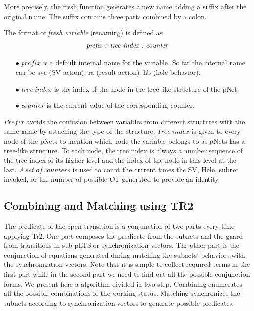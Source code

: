 \documentclass{lncs/llncs}
\newcommand{\TODO}[1]{\textcolor{red}{\textbf{[TODO:#1]}}}
\begin{document}
More precisely, the fresh function generates a new name adding a
suffix after the original name. The suffix contains three parts
combined by a colon.  


\begin{definition}\label{fresh-variable}
The format of \emph{fresh variable} (renaming) is defined as:
$$\emph{prefix : tree\ index\ :\ counter}$$
\begin{itemize}
   \item[$\bullet$] $prefix$ is a default internal name for the variable. So far the internal name can be  sva (SV action), ra (result action), hb (hole behavior).
   \item[$\bullet$] $tree\ index$ is the index of the node in the tree-like structure of the pNet.
   \item[$\bullet$] $counter$ is the current value of the corresponding counter.
\end{itemize}
\end{definition}


$Prefix$ avoids the confusion between variables from different structures with the same name by attaching the type of the structure. $Tree\ index$ is given to every node of the pNets to mention which node the variable belongs to as pNets has a tree-like structure. To each node, the tree index is always a number sequence of the tree index of its higher level and the index of the node in this level at the last. $A\ set\ of\ counters$ is used to count the current times the SV, Hole, subnet invoked, or the number of possible OT generated to provide an identity. 


\subsection{Combining and Matching using TR2}

The predicate of the open transition is a conjunction of two parts
every time applying Tr2. One part composes the predicate from the
subnets and the guard from transitions in sub-pLTS or synchronization
vectors. The other part is the conjunction of equations generated
during matching the subnets' behaviors with the synchronization
vectors. Note that it is simple to collect required terms in the first
part while in the second part we need to find out all the possible
conjunction forms. We present here a algorithm divided in two
step. Combining enumerates all the possible combinations of the
working status. Matching synchronizes the subnets according to
synchronization vectors to generate possible predicates.  
 
\end{document}
